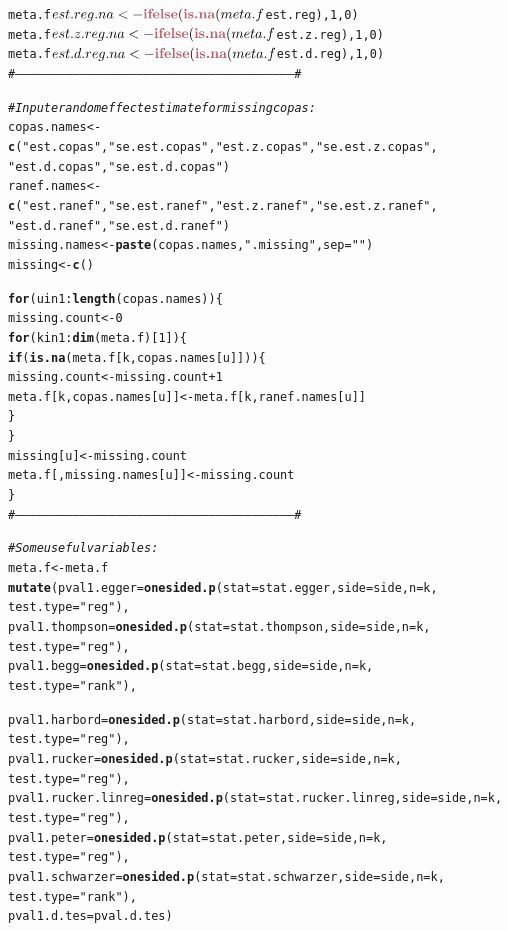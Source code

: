 \documentclass[11pt,a4paper,twoside]{book}\usepackage[]{graphicx}\usepackage[]{color}
\makeatletter
\newcommand{\hlstr}[1]{\textcolor[rgb]{0.192,0.494,0.8}{#1}}%
\newcommand{\hlcom}[1]{\textcolor[rgb]{0.678,0.584,0.686}{\textit{#1}}}%
\newcommand{\hlkwd}[1]{\textcolor[rgb]{0.737,0.353,0.396}{\textbf{#1}}}%
\newenvironment{kframe}{%
 \def\at@end@of@kframe{}%
 \ifinner\ifhmode%
  \def\at@end@of@kframe{\end{minipage}}%
  \begin{minipage}{\columnwidth}%
 \fi\fi%
 \def\FrameCommand##1{\hskip\@totalleftmargin \hskip-\fboxsep
 \colorbox{shadecolor}{##1}\hskip-\fboxsep
     \hskip-\linewidth \hskip-\@totalleftmargin \hskip\columnwidth}%
 \MakeFramed {\advance\hsize-\width
   \@totalleftmargin\z@ \linewidth\hsize
   \@setminipage}}%
 {\par\unskip\endMakeFramed%
 \at@end@of@kframe}
\newenvironment{knitrout}{}{} %
\makeatother
\begin{document}
\begin{knitrout}
\begin{kframe}
\begin{alltt}
meta.f$est.reg.na <- \hlkwd{ifelse}(\hlkwd{is.na}(meta.f$est.reg), 1, 0)
meta.f$est.z.reg.na <- \hlkwd{ifelse}(\hlkwd{is.na}(meta.f$est.z.reg), 1, 0)
meta.f$est.d.reg.na <- \hlkwd{ifelse}(\hlkwd{is.na}(meta.f$est.d.reg), 1, 0)
\hlcom{#--------------------------------------------------------------------------------------------------------------------#}

\hlcom{#Inpute random effect estimate for missing copas:}
copas.names <- \hlkwd{c}(\hlstr{"est.copas"}, \hlstr{"se.est.copas"}, \hlstr{"est.z.copas"}, \hlstr{"se.est.z.copas"}, 
                 \hlstr{"est.d.copas"}, \hlstr{"se.est.d.copas"})
ranef.names <- \hlkwd{c}(\hlstr{"est.ranef"}, \hlstr{"se.est.ranef"}, \hlstr{"est.z.ranef"}, \hlstr{"se.est.z.ranef"}, 
                 \hlstr{"est.d.ranef"}, \hlstr{"se.est.d.ranef"})
missing.names <- \hlkwd{paste}(copas.names, \hlstr{".missing"}, sep = \hlstr{""})
missing <- \hlkwd{c}()

\hlkwd{for}(u in 1:\hlkwd{length}(copas.names))\{
  missing.count <- 0
  \hlkwd{for}(k in 1:\hlkwd{dim}(meta.f)[1])\{
    \hlkwd{if}(\hlkwd{is.na}(meta.f[k, copas.names[u]]))\{
      missing.count <- missing.count + 1
      meta.f[k, copas.names[u]] <- meta.f[k, ranef.names[u]]
    \}
  \}
  missing[u] <- missing.count
  meta.f[, missing.names[u]] <- missing.count
\}
\hlcom{#--------------------------------------------------------------------------------------------------------------------#}

\hlcom{#Some useful variables:}
meta.f <- meta.f %
  \hlkwd{mutate}(pval1.egger = \hlkwd{onesided.p}(stat = stat.egger, side = side, n = k, 
                                  test.type = \hlstr{"reg"}),
         pval1.thompson = \hlkwd{onesided.p}(stat = stat.thompson, side = side, n = k, 
                                     test.type = \hlstr{"reg"}),
         pval1.begg = \hlkwd{onesided.p}(stat = stat.begg, side = side, n = k, 
                                 test.type = \hlstr{"rank"}),
         
         pval1.harbord = \hlkwd{onesided.p}(stat = stat.harbord, side = side, n = k, 
                                    test.type = \hlstr{"reg"}),
         pval1.rucker = \hlkwd{onesided.p}(stat = stat.rucker, side = side, n = k, 
                                   test.type = \hlstr{"reg"}),
         pval1.rucker.linreg = \hlkwd{onesided.p}(stat = stat.rucker.linreg, side = side, n = k, 
                                          test.type = \hlstr{"reg"}),
         pval1.peter = \hlkwd{onesided.p}(stat = stat.peter, side = side, n = k, 
                                  test.type = \hlstr{"reg"}),
         pval1.schwarzer = \hlkwd{onesided.p}(stat = stat.schwarzer, side = side, n = k, 
                                      test.type = \hlstr{"rank"}),
         pval1.d.tes = pval.d.tes)


\end{alltt}
\end{kframe}
\end{knitrout}
\end{document}
